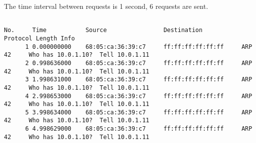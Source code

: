 The time interval between requests is 1 second, 6 requests are sent.

\begin{lstlisting}

No.     Time           Source                Destination           Protocol Length Info
      1 0.000000000    68:05:ca:36:39:c7     ff:ff:ff:ff:ff:ff     ARP      42     Who has 10.0.1.10?  Tell 10.0.1.11
      2 0.998636000    68:05:ca:36:39:c7     ff:ff:ff:ff:ff:ff     ARP      42     Who has 10.0.1.10?  Tell 10.0.1.11
      3 1.998631000    68:05:ca:36:39:c7     ff:ff:ff:ff:ff:ff     ARP      42     Who has 10.0.1.10?  Tell 10.0.1.11
      4 2.998653000    68:05:ca:36:39:c7     ff:ff:ff:ff:ff:ff     ARP      42     Who has 10.0.1.10?  Tell 10.0.1.11
      5 3.998634000    68:05:ca:36:39:c7     ff:ff:ff:ff:ff:ff     ARP      42     Who has 10.0.1.10?  Tell 10.0.1.11
      6 4.998629000    68:05:ca:36:39:c7     ff:ff:ff:ff:ff:ff     ARP      42     Who has 10.0.1.10?  Tell 10.0.1.11

\end{lstlisting}


